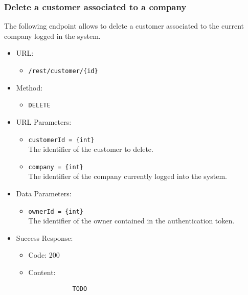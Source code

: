\subsubsection*{Delete a customer associated to a company}

The following endpoint allows to delete a customer associated to the current company logged in the system.

\begin{itemize}
    
    \item URL: 
    \begin{itemize}
        \item \texttt{/rest/customer/\{id\}}
    \end{itemize}

    \item Method: 
    \begin{itemize}
        \item \texttt{DELETE}
    \end{itemize}
    
    \item URL Parameters: 
    \begin{itemize}
        \item \texttt{customerId = \{int\}} \\
        The identifier of the customer to delete.
        \item \texttt{company = \{int\}} \\
        The identifier of the company currently logged into the system.
    \end{itemize}
    
    \item Data Parameters: 
    \begin{itemize}
        \item \texttt{ownerId = \{int\}} \\
        The identifier of the owner contained in the authentication token.
    \end{itemize}
    
    \item Success Response: 
    \begin{itemize}
        \item Code: 200
        \item Content:
        \begin{lstlisting}
            TODO
        \end{lstlisting}    
    \end{itemize}
    

\end{itemize}
